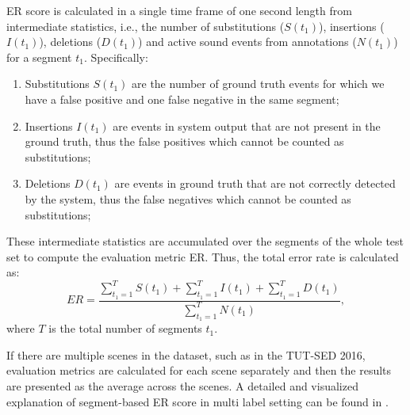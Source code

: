 ER score is calculated in a single time frame of one second length from intermediate statistics, i.e., the number of substitutions ($S(t_1)$), insertions ($I(t_1)$), deletions ($D(t_1)$) and active sound events from annotations ($N(t_1)$) for a segment $t_1$. Specifically:
\begin{enumerate}
	
	\item Substitutions $S(t_1)$ are the number of ground truth events for which we have a false positive and one false negative in the same segment; %
	
	\item Insertions $I(t_1)$ are events in system output that are not present in the ground truth, thus the false positives which cannot be counted as substitutions;%
	
	\item Deletions $D(t_1)$ are events in ground truth that are not correctly detected by the system, thus the false negatives which cannot be counted as substitutions;%
	
\end{enumerate}
These intermediate statistics are accumulated over the segments of the whole test set to compute the evaluation metric ER. Thus, the total error rate is calculated as:
\begin{equation}
ER = \frac{\sum_{t_1=1}^{T} S(t_1) + \sum_{t_1=1}^{T} I(t_1) + \sum_{t_1=1}^{T} D(t_1)}{\sum_{t_1=1}^{T} N(t_1)},
\end{equation}
where $T$ is the total number of segments $t_1$.

If there are multiple scenes in the dataset, such as in the TUT-SED 2016, evaluation metrics are calculated for each scene separately and then the results are presented as the average across the scenes.
A detailed and visualized explanation of segment-based ER score in multi label setting can be found in \cite{mesaros2016metrics}.